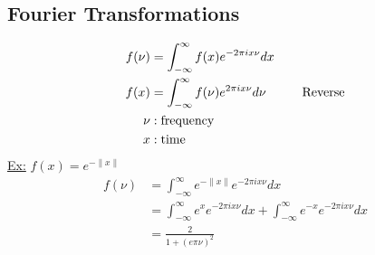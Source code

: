 \documentclass[12pt, a4paper]{article}
\newcommand{\tab}[1][1cm]{\hspace*{#1}}
\begin{document}
\subsection{Fourier Transformations}
\begin{align*}
f(\nu) &= \int_{-\infty}^{\infty}f(x)e^{-2\pi i x\nu}dx\\
f(x) &= \int_{-\infty}^{\infty}f(\nu)e^{2\pi i x \nu}d\nu \tab \text{Reverse}\\
\nu&: \text{frequency}\\
x&: \text{time}
\end{align*}
\underline{Ex:}
$f(x) = e^{-\|x\|}$
\begin{align*}
f(\nu)&=\int_{-\infty}^{\infty}e^{-\|x\|}e^{-2\pi i x \nu}dx\\
&=\int_{-\infty}^{\infty}e^{x}e^{-2\pi i x \nu}dx + \int_{-\infty}^{\infty}e^{-x}e^{-2\pi i x \nu}dx\\
&=\frac{2}{1+(e\pi \nu)^2}
\end{align*}
\end{document}
